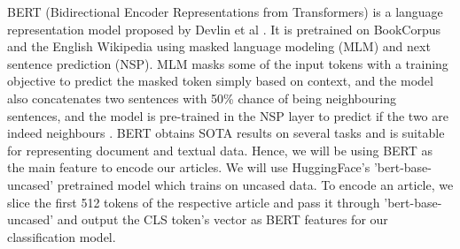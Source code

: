 \documentclass{article}
\begin{document}
\begin{table}
  \begin{center}
  \end{center}
  \caption{Examples of preprocessing and tokenization extraction on items in dataset.}
  \label{preprocessing}
\end{table}

BERT (Bidirectional Encoder Representations from Transformers) is a language representation model proposed by Devlin et al \cite{bert}. It is pretrained on BookCorpus and the English Wikipedia using masked language modeling (MLM) and next sentence prediction (NSP). MLM masks some of the input tokens with a training objective to predict the masked token simply based on context, and the model also concatenates two sentences with 50\% chance of being neighbouring sentences, and the model is pre-trained in the NSP layer to predict if the two are indeed neighbours \cite{bert}. BERT obtains SOTA results on several tasks and is suitable for representing document and textual data. Hence, we will be using BERT as the main feature to encode our articles. We will use HuggingFace's 'bert-base-uncased' pretrained model which trains on uncased data. To encode an article, we slice the first 512 tokens of the respective article and pass it through 'bert-base-uncased' and output the CLS token's vector as BERT features for our classification model.
\end{document}
